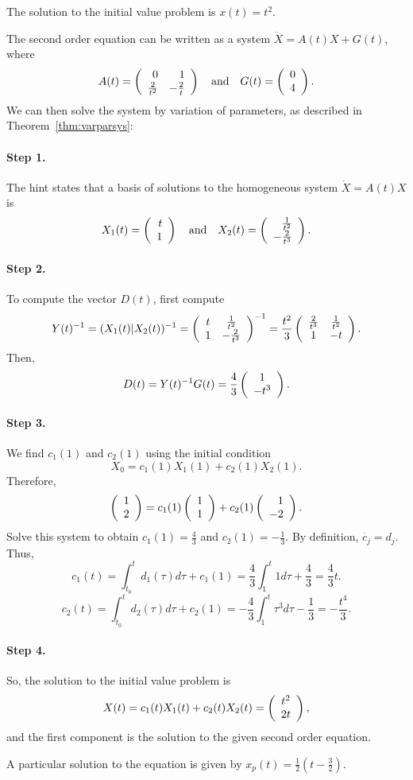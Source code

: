 \documentclass{ximera}
\begin{document}
 \ans The solution to the initial value problem is
$x(t) = t^2$.

\soln The second order equation can be written as a system
$\dot{X} = A(t)X + G(t)$, where
\[
A(t) = \left(\begin{array}{rr} 0 & 1\\ \frac{2}{t^2} &-\frac{2}{t}\end{array}\right) \quad\mbox{and}\quad G(t) = \left(\begin{array}{c} 0 \\ 4\end{array}\right).
\]
We can then solve the system by variation of parameters, as described in
Theorem~\ref{thm:varparsys}:

\paragraph{Step 1.} The hint states that
a basis of solutions to the homogeneous system
$\dot{X} = A(t)X$ is
\[
X_1(t) = \left(\begin{array}{r} t \\ 1\end{array}\right) \quad\mbox{and}\quad X_2(t) = \left(\begin{array}{r} \frac{1}{t^2} \\ -\frac{2}{t^3}\end{array}\right).
\]
\paragraph{Step 2.} To compute the vector $D(t)$, first compute
\[
Y(t)^{-1} = (X_1(t)|X_2(t))^{-1} =
\left(\begin{array}{cc} t & \frac{1}{t^2}\\ 1 &-\frac{2}{t^3}\end{array}\right)^{-1} =
\frac{t^2}{3}\left(\begin{array}{cc} \frac{2}{t^3} & \frac{1}{t^2}\\ 1 &-t\end{array}\right).
\]
Then,
\[
D(t) = Y(t)^{-1}G(t) = \frac{4}{3}\left(\begin{array}{c} 1 \\ -t^3\end{array}\right).
\]
\paragraph{Step 3.} We find $c_1(1)$ and $c_2(1)$ using the initial
condition
\[
X_0 = c_1(1)X_1(1) + c_2(1)X_2(1).
\]
Therefore,
\[
\left(\begin{array}{r} 1 \\ 2\end{array}\right) = c_1(1)\left(\begin{array}{r} 1 \\ 1\end{array}\right) + c_2(1)\left(\begin{array}{r} 1 \\ -2\end{array}\right).
\]
Solve this system to obtain $c_1(1) = \frac{4}{3}$ and $c_2(1) = -\frac{1}{3}$.
By definition,
$\dot{c_j} = d_j$.  Thus,
\[
c_1(t) = \int_{t_0}^td_1(\tau)d\tau + c_1(1)
= \frac{4}{3}\int_{1}^t 1 d\tau + \frac{4}{3} = \frac{4}{3}t.
\]
\[
c_2(t) = \int_{t_0}^td_2(\tau)d\tau + c_2(1)
= -\frac{4}{3}\int_{1}^t\tau^3 d\tau - \frac{1}{3}= -\frac{t^4}{3}.
\]
\paragraph{Step 4.} So, the solution to the initial value problem is
\[
X(t) = c_1(t)X_1(t) + c_2(t)X_2(t) = \left(\begin{array}{c} t^2 \\ 2t\end{array}\right),
\]
and the first component is the solution to the given second order
equation.

 \ans A particular solution to the equation is given by
$x_p(t) = \frac{1}{2}(t-\frac{3}{2})$.
\end{document}

